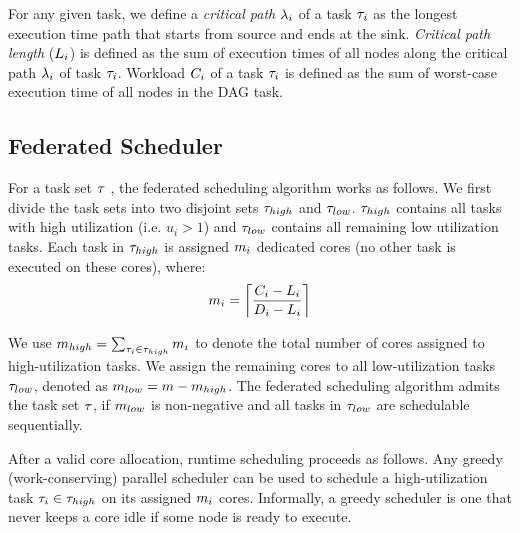 For any given task, we define a \textit{critical path} $\criticalpath{i}$ of a 
task $\tau_{i}$ as the longest execution time path that starts from
source and ends at the sink. \textit{Critical path length} ($\criticalpathlen{i}$) is
defined as the sum of execution times of all nodes along the critical
path $\criticalpath{i}$ of task $\tau_{i}$.  Workload $\workload{i}$ of
a task $\tau_{i}$ is defined as the sum of worst-case execution time of
all nodes in the DAG task. 

\subsection{Federated Scheduler}
For a task set $\tau$ , the federated scheduling algorithm works as
follows. We first divide the task sets into two disjoint sets
$\tau_{high}$  and $\tau_{low}$. $\tau_{high}$ contains all tasks with
high utilization (i.e. $u_i > 1$) and $\tau_{low}$ contains all
remaining low utilization tasks. Each task in $\tau_{high}$ is
assigned $m_{i}$ dedicated cores (no other task is executed on these
cores), where: \begin{equation}\label{eq:m} \noofcores{i} = \left\lceil \frac{\workload{i} - \criticalpathlen{i}}{\Deadline{i} - \criticalpathlen{i}}
\right\rceil \end{equation}

We use $m_{high} = \sum_{\tau_{i} \in \tau_{high}} m_{i}$ to denote the total
number of cores assigned to high-utilization tasks. We assign
the remaining cores to all low-utilization tasks $\tau_{low}$, denoted
as ${m_{low} =  m - m_{high}}$. The federated scheduling algorithm admits
the task set ${\tau}$, if $m_{low}$ is non-negative and all tasks in
$\tau_{low}$ are schedulable sequentially.  

After a valid core allocation, runtime scheduling proceeds as
follows. Any greedy (work-conserving) parallel scheduler can be used
to schedule a high-utilization task $\tau_{i} \in \tau_{high}$ on its
assigned $m_{i}$ cores. Informally, a greedy scheduler is one that never
keeps a core idle if some node is ready to execute. 

